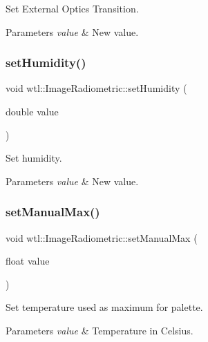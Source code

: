 Set External Optics Transition. 


\begin{DoxyParams}{Parameters}
{\em value} & New value. \\
\hline
\end{DoxyParams}
\mbox{\label{classwtl_1_1_image_radiometric_a721bc10f81a64770f5e7d406595d9d40}} 
\subsubsection{\texorpdfstring{set\+Humidity()}{setHumidity()}}
{\footnotesize\ttfamily void wtl\+::\+Image\+Radiometric\+::set\+Humidity (\begin{DoxyParamCaption}\item[{double}]{value }\end{DoxyParamCaption})}



Set humidity. 


\begin{DoxyParams}{Parameters}
{\em value} & New value. \\
\hline
\end{DoxyParams}
\mbox{\label{classwtl_1_1_image_radiometric_ac3064fb2a267f4b2a7975069e5da4920}} 
\subsubsection{\texorpdfstring{set\+Manual\+Max()}{setManualMax()}}
{\footnotesize\ttfamily void wtl\+::\+Image\+Radiometric\+::set\+Manual\+Max (\begin{DoxyParamCaption}\item[{float}]{value }\end{DoxyParamCaption})}



Set temperature used as maximum for palette. 


\begin{DoxyParams}{Parameters}
{\em value} & Temperature in Celsius. \\
\hline
\end{DoxyParams}
\mbox{\label{classwtl_1_1_image_radiometric_ae700fe57e3bd44bb8f4ace0b85992fd9}} 
